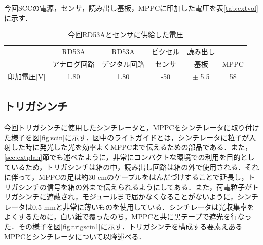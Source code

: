今回SCCの電源，センサ，読み出し基板，MPPCに印加した電圧を表\ref{tab:extvol}に示す．
\begin{table}[h]
  \centering
  \caption{今回RD53Aとセンサに供給した電圧}
  \begin{tabular} {|l|cc|c|c|c|} \hline
     & RD53A & RD53A & ピクセル & 読み出し & \\ 
     & アナログ回路 & デジタル回路 & センサ & 基板 & MPPC \\ \hline
    印加電圧[$\mathrm{V}$] & 1.80 & 1.80 & -50 & $\pm$ 5.5 & 58\\ \hline
  \end{tabular}
  \label{tab:voltage}
\end{table}


\subsection{トリガシンチ}
今回トリガシンチに使用したシンチレータと，MPPCをシンチレータに取り付けた様子を図\ref{fig:scin}に示す．図中のライトガイドとは，シンチレータに粒子が入射した時に発光した光を効率よくMPPCまで伝えるための部品である．また，\ref{sec:extplan}節でも述べたように，非常にコンパクトな環境での利用を目的としているため，トリガシンチは箱の中，読み出し回路は箱の外で使用される．それに伴って，MPPCの足は約30 $\mathrm{cm}$のケーブルをはんだづけすることで延長し，トリガシンチの信号を箱の外まで伝えられるようにしてある．また，荷電粒子がトリガシンチに遮蔽され，モジュールまで届かなくなることがないように，シンチレータは0.5 $\mathrm{mm}$と非常に薄いものを使用している．シンチレータは光収集率をよくするために，白い紙で覆ったのち，MPPCと共に黒テープで遮光を行なった．その様子を図\ref{fig:trigscin1}に示す．トリガシンチを構成する要素えあるMPPCとシンチレータについて以降述べる．

